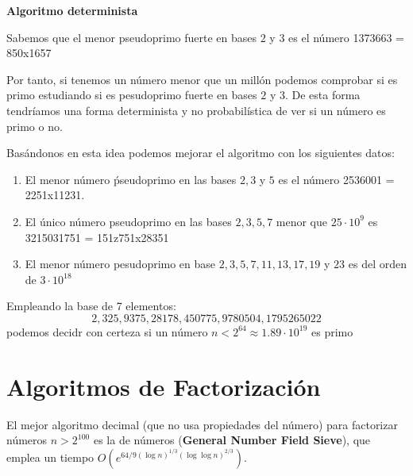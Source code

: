 \begin{example}\textbf{Algoritmo determinista}

Sabemos que el menor pseudoprimo fuerte en bases $2$ y $3$ es el número 1373663 = 850x1657

Por tanto, si tenemos un número menor que un millón podemos comprobar si es primo estudiando si es pesudoprimo fuerte en bases $2$ y $3$. De esta forma tendríamos una forma determinista y no probabilística de ver si un número es primo o no.

Basándonos en esta idea podemos mejorar el algoritmo con los siguientes datos:
\begin{enumerate}
\item El menor número ṕseudoprimo en las bases $2,3$ y $5$ es el número 2536001 = 2251x11231.

\item El único número pseudoprimo en las bases $2,3,5,7$ menor que $25 \cdot 10^9$ es 3215031751 = 151z751x28351

\item El menor número pesudoprimo en base $2,3,5,7,11,13,17,19$ y $23$ es del orden de $3 \cdot 10^{18}$

\end{enumerate}
\end{example}

\begin{theorem}
Empleando la base de 7 elementos:
\[2,325,9375,28178,450775,9780504,1795265022\]
podemos decidr con certeza si un número $n<2^{64}\approx 1.89\cdot 10^{19}$ es primo
\end{theorem}

\section{Algoritmos de Factorización}
El mejor algoritmo decimal (que no usa propiedades del número) para factorizar números $n>2^{100}$ es la  de números (\textbf{General Number Field Sieve}), que emplea un tiempo $O\left(e^{64/9 (\log n)^{1/3}(\log\log n)^{2/3}} \right)$.

